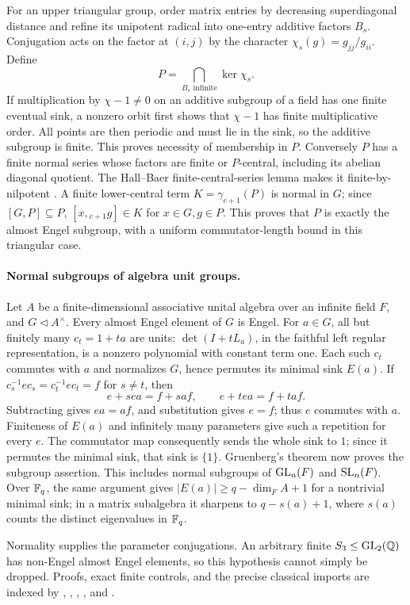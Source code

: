 For an upper triangular group, order matrix entries by decreasing
superdiagonal distance and refine its unipotent radical into
one-entry additive factors \(B_s\). Conjugation acts on the
factor at \((i,j)\) by the character
\(\chi_s(g)=g_{jj}/g_{ii}\). Define
\[
 P=\bigcap_{B_s\text{ infinite}}\ker\chi_s.
\]
If multiplication by \(\chi-1\ne0\) on an additive subgroup of
a field has one finite eventual sink, a nonzero orbit first
shows that \(\chi-1\) has finite multiplicative order.
All points are then periodic and must lie in the sink, so the
additive subgroup is finite. This proves necessity of membership
in \(P\).
Conversely \(P\) has a finite normal series whose factors are
finite or \(P\)-central, including its abelian diagonal quotient.
The Hall--Baer finite-central-series lemma makes it
finite-by-nilpotent \cite{wehrfritz-engel}.
A finite lower-central term \(K=\gamma_{c+1}(P)\) is normal
in \(G\); since \([G,P]\subseteq P\),
\([x,{}_{c+1}g]\in K\) for \(x\in G,g\in P\).
This proves that \(P\) is exactly the almost Engel subgroup,
with a uniform commutator-length bound in this triangular case.

\paragraph{Normal subgroups of algebra unit groups.}
Let \(A\) be a finite-dimensional associative unital algebra over
an infinite field \(F\), and \(G\lhd A^\times\).
Every almost Engel element of \(G\) is Engel.
For \(a\in G\), all but finitely many \(c_t=1+ta\) are units:
\(\det(I+tL_a)\), in the faithful left regular representation,
is a nonzero polynomial with constant term one.
Each such \(c_t\) commutes with \(a\) and normalizes \(G\), hence
permutes its minimal sink \(E(a)\).
If \(c_s^{-1}ec_s=c_t^{-1}ec_t=f\) for \(s\ne t\), then
\[
 e+s ea=f+s af,\qquad e+t ea=f+t af.
\]
Subtracting gives \(ea=af\), and substitution gives \(e=f\);
thus \(e\) commutes with \(a\).
Finiteness of \(E(a)\) and infinitely many parameters give such
a repetition for every \(e\). The commutator map consequently
sends the whole sink to \(1\); since it permutes the minimal
sink, that sink is \(\{1\}\). Gruenberg's theorem now proves
the subgroup assertion. This includes normal subgroups of
\(\operatorname{GL}_n(F)\) and \(\operatorname{SL}_n(F)\).
Over \(\mathbb F_q\), the same argument gives
\(|E(a)|\ge q-\dim_F A+1\) for a nontrivial minimal sink;
in a matrix subalgebra it sharpens to \(q-s(a)+1\), where
\(s(a)\) counts the distinct eigenvalues in \(\mathbb F_q\).

Normality supplies the parameter conjugations. An arbitrary
finite \(S_3\le\operatorname{GL}_2(\mathbb Q)\) has non-Engel almost Engel elements,
so this hypothesis cannot simply be dropped.
Proofs, exact finite controls, and the precise classical imports
are indexed by ,
,
,
, and
.
